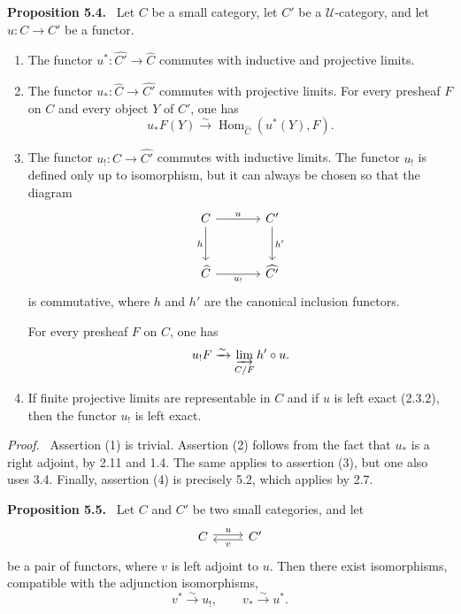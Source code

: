 \documentclass[11pt]{article}
\newcommand{\U}{\mathcal{U}}
\newcommand{\Hom}{\operatorname{Hom}}
\newenvironment{statement}[1]{\par\medskip\noindent\textbf{#1.}\ }{\par\medskip}
\newenvironment{proofsketch}{\par\noindent\emph{Proof.}\ }{\par\medskip}
\begin{document}
\begin{statement}{Proposition 5.4}
Let $C$ be a small category, let $C'$ be a $\U$-category, and let $u:C\to C'$ be a functor.
\begin{enumerate}[label=\arabic*)]
\item The functor $u^*:\widehat{C'}\to\widehat C$ commutes with inductive and projective limits.
\item The functor $u_*:\widehat C\to\widehat{C'}$ commutes with projective limits. For every presheaf $F$ on $C$ and every object $Y$ of $C'$, one has
\[
u_*F(Y)\xrightarrow{\sim}\Hom_{\widehat C}(u^*(Y),F).
\]
\item The functor $u_!:\widehat C\to\widehat{C'}$ commutes with inductive limits. The functor $u_!$ is defined only up to isomorphism, but it can always be chosen so that the diagram
\[
\begin{tikzcd}[column sep=large,row sep=large]
C\arrow[r,"u"]\arrow[d,"h"']&C'\arrow[d,"h'"]\\
\widehat C\arrow[r,"u_!"']&\widehat{C'}
\end{tikzcd}
\]
is commutative, where $h$ and $h'$ are the canonical inclusion functors.

For every presheaf $F$ on $C$, one has
\[
u_!F\xrightarrow{\sim}\varinjlim_{C/F}h'\circ u.
\]
\item If finite projective limits are representable in $C$ and if $u$ is left exact (2.3.2), then the functor $u_!$ is left exact.
\end{enumerate}
\end{statement}

\begin{proofsketch}
Assertion (1) is trivial. Assertion (2) follows from the fact that $u_*$ is a right adjoint, by 2.11 and 1.4. The same applies to assertion (3), but one also uses 3.4. Finally, assertion (4) is precisely 5.2, which applies by 2.7.
\end{proofsketch}

\begin{statement}{Proposition 5.5}
Let $C$ and $C'$ be two small categories, and let
\[
\begin{tikzcd}
C\arrow[r,shift left=.45ex,"u"]&C'\arrow[l,shift left=.45ex,"v"]
\end{tikzcd}
\]
be a pair of functors, where $v$ is left adjoint to $u$. Then there exist isomorphisms, compatible with the adjunction isomorphisms,
\[
v^*\xrightarrow{\sim}u_!,\qquad v_*\xrightarrow{\sim}u^*.
\]
\end{statement}
\end{document}
